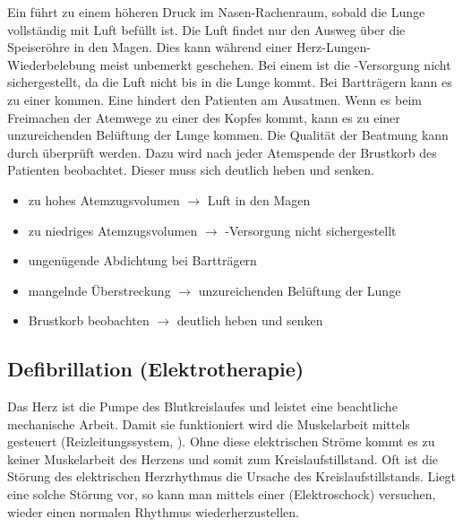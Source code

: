 {
Ein  führt zu einem höheren
Druck im Nasen-Rachenraum, sobald die Lunge vollständig mit
Luft befüllt ist. Die Luft findet nur den Ausweg über die
Speiseröhre in den Magen. Dies kann während einer
Herz-Lungen-Wiederbelebung meist unbemerkt geschehen. Bei
einem  ist die
-Versorgung nicht sichergestellt, da die Luft nicht
bis in die Lunge kommt. Bei Bartträgern kann es zu einer
 kommen. Eine  hindert den Patienten am Ausatmen. Wenn es
beim Freimachen der Atemwege zu einer  des Kopfes kommt, kann es zu einer
unzureichenden Belüftung der Lunge kommen. Die Qualität der
Beatmung kann durch 
überprüft werden. Dazu wird nach jeder Atemspende der
Brustkorb des Patienten beobachtet. Dieser muss sich
deutlich heben und senken.
}{
\begin{itemize}
  \item zu hohes Atemzugsvolumen ${\rightarrow}$ Luft in den Magen
  \item zu niedriges Atemzugsvolumen ${\rightarrow}$ -Versorgung nicht
  sichergestellt
  \item ungenügende Abdichtung bei Bartträgern
  \item mangelnde Überstreckung ${\rightarrow}$ unzureichenden Belüftung der
  Lunge
  \item Brustkorb beobachten ${\rightarrow}$ deutlich heben und senken
\end{itemize}
}{}{}{}

\subsection{Defibrillation (Elektrotherapie)}

Das Herz ist die Pumpe des Blutkreislaufes und leistet eine
beachtliche mechanische Arbeit. Damit sie funktioniert wird
die Muskelarbeit mittels  gesteuert
(Reizleitungssystem,
). Ohne diese
elektrischen Ströme kommt es zu keiner Muskelarbeit des
Herzens und somit zum Kreislaufstillstand.
Oft ist die Störung des elektrischen Herzrhythmus die
Ursache des Kreislaufstillstands. Liegt eine solche Störung
vor, so kann man mittels einer 
(Elektroschock) versuchen, wieder einen normalen Rhythmus
wiederherzustellen.

